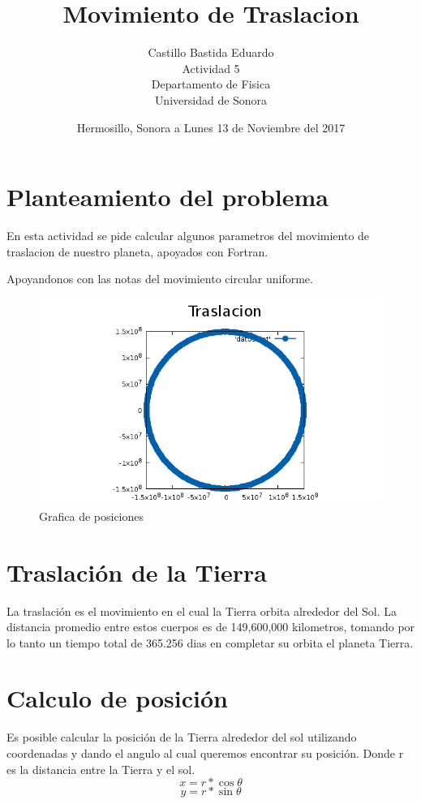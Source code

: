 \documentclass[12pt,a4paper,twoside]{article}
\author{Castillo Bastida Eduardo\\
Actividad 5\\
Departamento de Fisica\\
Universidad de Sonora}
\date{Hermosillo, Sonora a Lunes 13 de Noviembre del 2017}
\title{\textbf{Movimiento de Traslacion}}
\begin{document}
\maketitle
\section{Planteamiento del problema}
En esta actividad se pide calcular algunos parametros del movimiento de traslacion de nuestro planeta, apoyados con Fortran.

Apoyandonos con las notas del movimiento circular uniforme.

\begin{figure}[h!]
  \includegraphics[width=\linewidth]{GraficaMCU.png}
  \caption{Grafica de posiciones}
  \label{fig:Grafica}
\end{figure}


\maketitle
\section{Traslación de la Tierra}
La traslación es el movimiento en el cual la Tierra orbita alrededor del Sol. La distancia promedio entre estos cuerpos es de 149,600,000 kilometros, tomando por lo tanto un tiempo total de 365.256 dias en completar su orbita el planeta Tierra.

\section{Calculo de posición}
Es posible calcular la posición de la Tierra alrededor del sol utilizando coordenadas y dando el angulo al cual queremos encontrar su posición. Donde r es la distancia entre la Tierra y el sol.
\begin{equation}
x= r * \cos\theta
\end{equation}
\begin{equation}
y= r * \sin\theta
\end{equation}
\end{document}
